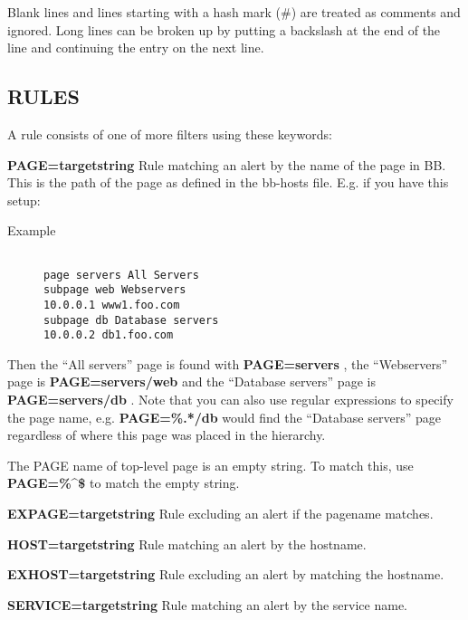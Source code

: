   Blank lines and lines starting with a hash mark (\#) are treated as comments and ignored. Long lines can be broken up by putting a backslash at the end of the line and continuing the entry on the next line. 


 
\subsection{RULES}
 A rule consists of one of more filters using these keywords: 

 \textbf{PAGE=targetstring}
 Rule matching an alert by the name of the page in BB. This is the
 path of the page as defined in the bb-hosts file. E.g. if you have
 this setup: 

\begin{description}
\item[Example]

\begin{verbatim}

page servers All Servers
subpage web Webservers
10.0.0.1 www1.foo.com
subpage db Database servers
10.0.0.2 db1.foo.com

\end{verbatim}


\end{description}



  Then the ``All servers'' page is found with \textbf{PAGE=servers}
, the ``Webservers'' page is \textbf{PAGE=servers/web}
 and the ``Database servers'' page is \textbf{PAGE=servers/db}
. Note that you can also use regular expressions to specify the page name, e.g. \textbf{PAGE=\%.*/db}
 would find the ``Database servers'' page regardless of where this page was placed in the hierarchy. 


  The PAGE name of top-level page is an empty string. To match this, use \textbf{PAGE=\%\^{}\$}
 to match the empty string. 


 


 \textbf{EXPAGE=targetstring}
 Rule excluding an alert if the pagename matches. 


 \textbf{HOST=targetstring}
 Rule matching an alert by the hostname. 


 \textbf{EXHOST=targetstring}
 Rule excluding an alert by matching the hostname. 


 \textbf{SERVICE=targetstring}
 Rule matching an alert by the service name. 


